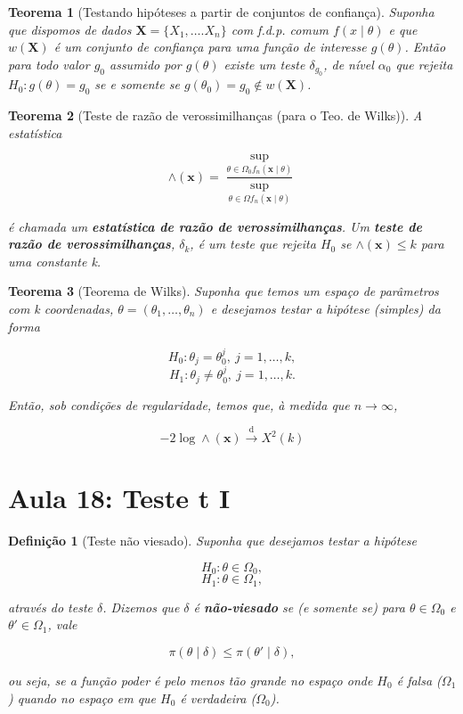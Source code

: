 \documentclass{article}
\newtheorem{theorem}{Teorema}
\newtheorem{definition}{Definição}
\begin{document}
	\begin{theorem}[Testando hipóteses a partir de conjuntos de confiança]
		Suponha que dispomos de dados $\textbf{X} = \{ X_1, \ldots. X_n \}$ com f.d.p. comum $f(x \mid \theta)$ e que $w(\textbf{X})$ é um conjunto de confiança para uma função de interesse $g(\theta)$. Então para todo valor $g_0$ assumido por $g(\theta)$ existe um teste $\delta_{g_0}$, de nível $\alpha_0$ que rejeita $H_0 : g(\theta) = g_0$ se e somente se $g(\theta_0) = g_0 \notin w(\textbf{X})$.
	\end{theorem}
	
	\begin{theorem}[Teste de razão de verossimilhanças (para o Teo. de Wilks)]
		A estatística
		
		$$\wedge(\textbf{x}) = \frac{\sup_{\theta \in \Omega_0 f_n (\textbf{x} \mid \theta)}}{\sup_{\theta \in \Omega f_n (\textbf{x} \mid \theta)}}$$
		
		é chamada um \textbf{estatística de razão de verossimilhanças}. Um \textbf{teste de razão de verossimilhanças}, $\delta_k$, é um teste que rejeita $H_0$ se $\wedge(\textbf{x}) \leq k$ para uma constante k.
	\end{theorem}
	
	\begin{theorem}[Teorema de Wilks]
		Suponha que temos um espaço de parâmetros com k coordenadas, $\theta = (\theta_1, \ldots, \theta_n)$ e desejamos testar a hipótese (simples) da forma
		
		$$H_0 : \theta_j = \theta_0^j, \ j = 1, \ldots, k,$$
		$$H_1 : \theta_j \neq \theta_0^j, \ j = 1, \ldots, k.$$
		
		Então, sob condições de regularidade, temos que, à medida que $n \rightarrow \infty$,
		
		$$-2 \log \wedge(\textbf{x}) \stackrel{\mathrm{d}}{\rightarrow} X^2 (k)$$
	\end{theorem}
	
	\section*{Aula 18: Teste t I}\label{s18}
	\begin{definition}[Teste não viesado]
		Suponha que desejamos testar a hipótese
		
		$$H_0 : \theta \in \Omega_0,$$
		$$H_1 : \theta \in \Omega_1,$$
		
		através do teste $\delta$. Dizemos que $\delta$ é \textbf{não-viesado} se (e somente se) para $\theta \in \Omega_0$ e $\theta' \in \Omega_1$, vale
		
		$$\pi (\theta \mid \delta) \leq \pi (\theta' \mid \delta),$$
		
		ou seja, se a função poder é pelo menos tão grande no espaço onde $H_0$ é falsa ($\Omega_1$) quando no espaço em que $H_0$ é verdadeira ($\Omega_0$).
	\end{definition}
	
\end{document}
